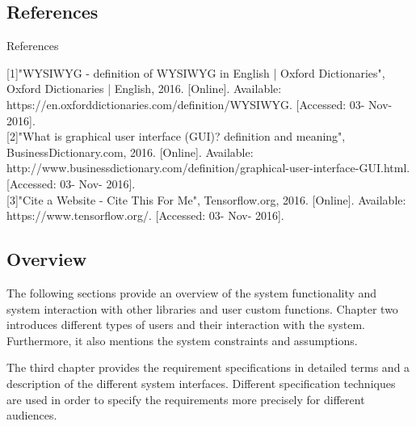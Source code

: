 \documentclass[journal,10pt,onecolumn,compsoc]{IEEEtran} \usepackage[margin=1.0in]{geometry} \usepackage{pdfpages} \usepackage{graphicx}
\begin{document}
\subsection{References}
References

[1]"WYSIWYG - definition of WYSIWYG in English | Oxford Dictionaries", Oxford Dictionaries | English, 2016. [Online]. Available: https://en.oxforddictionaries.com/definition/WYSIWYG. [Accessed: 03- Nov- 2016].\\

[2]"What is graphical user interface (GUI)? definition and meaning", BusinessDictionary.com, 2016. [Online]. Available: http://www.businessdictionary.com/definition/graphical-user-interface-GUI.html. [Accessed: 03- Nov- 2016].\\

[3]"Cite a Website - Cite This For Me", Tensorflow.org, 2016. [Online]. Available: https://www.tensorflow.org/. [Accessed: 03- Nov- 2016]. \\
 
 

\subsection{Overview}

The following sections provide an overview of the system functionality and system interaction with other libraries and user custom functions. 
Chapter two introduces different types of users and their interaction with the system. 
Furthermore, it also mentions the system constraints and assumptions.

\noindent The third chapter provides the requirement specifications in detailed terms and a description of the different system interfaces. 
Different specification techniques are used in order to specify the requirements more precisely for different audiences.
\end{document}
